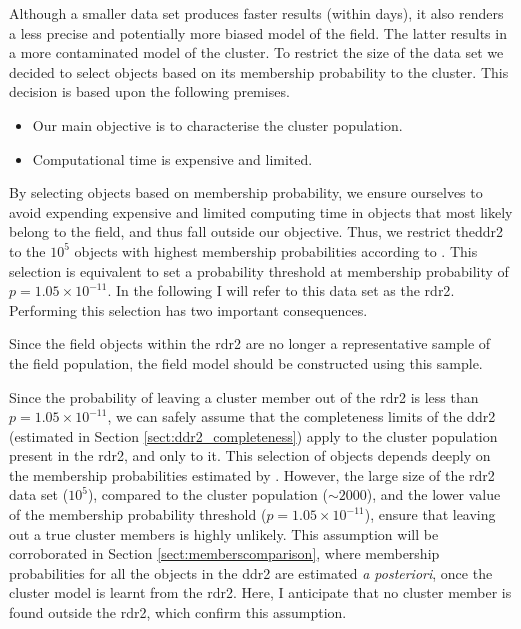 Although a smaller data set produces faster results (within days), it also renders a less precise and potentially more biased model of the field. The latter results in a more contaminated model of the cluster. To restrict the size of the data set we decided to select objects based on its membership probability to the cluster. This decision is based upon the following premises.

\begin{itemize}
\item Our main objective is to characterise the cluster population. 
\item Computational time is expensive and limited.
\end{itemize}
 
By selecting objects based on membership probability, we ensure ourselves to avoid expending expensive and limited computing time in objects that most likely belong to the field, and thus fall outside our objective. Thus, we restrict the\gls{ddr2} to the $10^5$ objects with highest membership probabilities according to \citet{Bouy2015}. This selection is equivalent to set a probability threshold at membership probability of $p=1.05 \times 10^{-11}$. In the following I will refer to this data set as the \gls{rdr2}. Performing this selection has two important consequences.

Since the field objects within the \gls{rdr2} are no longer a representative sample of the field population, the field model should be constructed using this sample.

Since the probability of leaving a cluster member out of the \gls{rdr2} is less than $p=1.05 \times 10^{-11}$, we can safely assume that the completeness limits of the \gls{ddr2} (estimated in Section \ref{sect:ddr2_completeness}) apply to the cluster population present in the \gls{rdr2}, and only to it. This selection of objects depends deeply on the membership probabilities estimated by \citet{Bouy2015}. However, the large size of the \gls{rdr2} data set ($10^5$), compared to the cluster population ($\sim2000$), and the lower value of the membership probability threshold ($p=1.05 \times 10^{-11}$), ensure that leaving out a true cluster members is highly unlikely. This assumption will be corroborated in Section \ref{sect:memberscomparison}, where membership probabilities for all the objects in the \gls{ddr2} are estimated \emph{a posteriori}, once the cluster model is learnt from the \gls{rdr2}. Here, I anticipate that no cluster member is found outside the \gls{rdr2}, which confirm this assumption.

